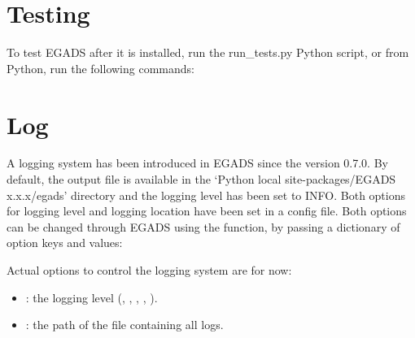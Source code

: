 \documentclass[a4paper,10pt,openany,english]{sphinxmanual}
\begin{document}
\section{Testing}
\label{install:testing}
To test EGADS after it is installed, run the run\_tests.py Python script, or from Python, run the following commands:

\begin{sphinxVerbatim}[commandchars=\\\{\}]
 
\end{sphinxVerbatim}


\section{Log}
\label{install:log}
A logging system has been introduced in EGADS since the version 0.7.0. By default, the output file is available in the `Python local site-packages/EGADS x.x.x/egads' directory and the logging level has been set to INFO. Both options for logging level and logging location have been set in a config file. Both options can be changed through EGADS using the  function, by passing a dictionary of option keys and values:

\begin{sphinxVerbatim}[commandchars=\\\{\}]
 
     
\end{sphinxVerbatim}

Actual options to control the logging system are for now:
\begin{itemize}
\item {} 
: the logging level (, , , , ).

\item {} 
: the path of the file containing all logs.

\end{itemize}
\end{document}
